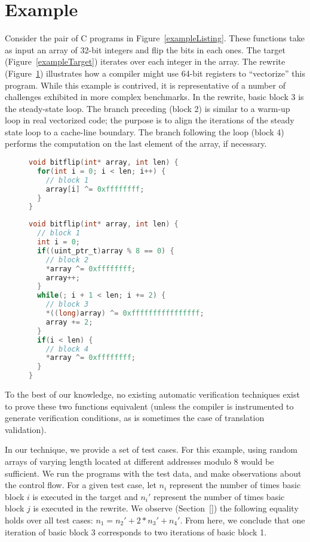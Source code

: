 \section{Example}\label{example-sec}

Consider the pair of C programs in Figure~\ref{exampleListing}. These
functions take as input an array of 32-bit integers and flip the bits
in each ones. The target (Figure~\ref{exampleTarget}) iterates over
each integer in the array. The rewrite (Figure~\ref{exampleRewrite})
illustrates how a compiler might use 64-bit registers to ``vectorize''
this program. While this example is contrived, it is representative of
a number of challenges exhibited in more complex benchmarks. In the
rewrite, basic block 3 is the steady-state loop. The branch preceding
(block 2) is similar to a warm-up loop in real vectorized code; the
purpose is to align the iterations of the steady state loop to a
cache-line boundary. The branch following the loop (block 4) performs
the computation on the last element of the array, if necessary.

\begin{figure}\label{exampleListing}
\begin{lstlisting}[language=C]
void bitflip(int* array, int len) {
  for(int i = 0; i < len; i++) {
    // block 1
    array[i] ^= 0xffffffff;
  }
}
\end{lstlisting}
\label{exampleTarget}
\begin{lstlisting}[language=C]
void bitflip(int* array, int len) {
  // block 1
  int i = 0;
  if((uint_ptr_t)array % 8 == 0) {
    // block 2
    *array ^= 0xffffffff;
    array++;
  } 
  while(; i + 1 < len; i += 2) {
    // block 3
    *((long)array) ^= 0xffffffffffffffff;
    array += 2;
  }
  if(i < len) {
    // block 4
    *array ^= 0xffffffff;
  }
}
\end{lstlisting}
\label{exampleRewrite}
\end{figure}

To the best of our knowledge, no existing automatic verification
techniques exist to prove these two functions equivalent (unless the
compiler is instrumented to generate verification conditions, as is
sometimes the case of translation validation).

In our technique, we provide a set of test cases. For this example,
using random arrays of varying length located at different addresses
modulo 8 would be sufficient. We run the programs with the test data,
and make observations about the control flow. For a given test case,
let $n_i$ represent the number of times basic block $i$ is executed in
the target and $n_i'$ represent the number of times basic block $j$
is executed in the rewrite. We observe (Section~\ref{}) the following
equality holds over all test cases: $n_1 = n_2' + 2*n_3' + n_4'$. From
here, we conclude that one iteration of basic block 3 corresponds to
two iterations of basic block 1.

